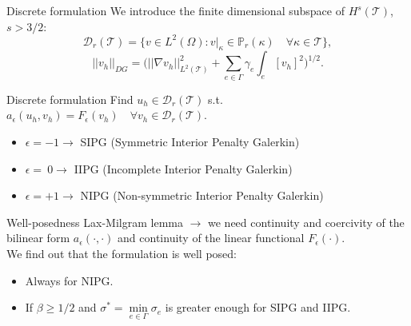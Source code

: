 \documentclass{beamer}
\begin{document}
\begin{frame}{Discrete formulation}
	We introduce the finite dimensional subspace of $H^s(\mathcal{T})$, $s>3/2$:
	\begin{equation*}
	\mathcal{D}_r(\mathcal{T}) = \{ v \in L^2(\Omega) : v|_\kappa \in
	\mathbb{P}_r(\kappa) \quad \forall \kappa \in \mathcal{T}  \},
	\end{equation*}
	\begin{equation*}
		|\!|v_h|\!|_{DG} = \bigg( |\!|\nabla v_h|\!|^2_{L^2(\mathcal{T})} +
		\sum_{e \in \Gamma} \gamma_e \int_e [v_h]^2 \bigg)^{1/2}.
	\end{equation*}
	\begin{block}{Discrete formulation}
	Find $u_h \in \mathcal{D}_r(\mathcal{T})$ s.t. $a_\epsilon(u_h, v_h) =
	F_\epsilon(v_h) \quad \forall v_h \in \mathcal{D}_r(\mathcal{T})$.
	\end{block}
	\begin{itemize}
		\item $\epsilon = -1 \rightarrow$ SIPG (Symmetric Interior Penalty
		Galerkin)
		\item $\epsilon = ~0 \rightarrow$ IIPG (Incomplete Interior Penalty
		Galerkin)
		\item $\epsilon = +1 \rightarrow$ NIPG (Non-symmetric Interior Penalty
		Galerkin)
	\end{itemize}
\end{frame}
\begin{frame}{Well-posedness}
	Lax-Milgram lemma $\rightarrow$ we need continuity and coercivity of the
	bilinear form $a_\epsilon (\cdot, \cdot)$ and continuity of the linear
	functional $F_\epsilon(\cdot)$.\\
	\vspace*{0.5cm}
	We find out that the formulation is well posed:
	\begin{itemize}
		\item Always for NIPG.
		\item If $\beta \geq 1/2$ and $\sigma^* = \min\limits_{e \in \Gamma}
		\sigma_e$ is greater enough for SIPG and IIPG.
	\end{itemize}
\end{frame}
\end{document}
